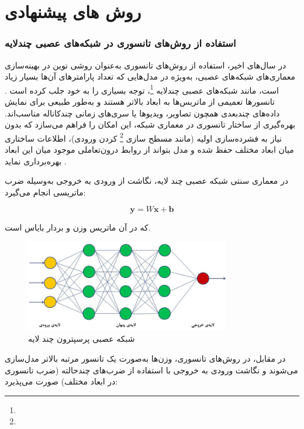 \chapter{روش های پیشنهادی}



\subsection*{استفاده از روش‌های تانسوری در شبکه‌های عصبی چندلایه}

در سال‌های اخیر، استفاده از روش‌های تانسوری به‌عنوان روشی نوین در بهینه‌سازی معماری‌های شبکه‌های عصبی، به‌ویژه در مدل‌هایی که تعداد پارامترهای آن‌ها بسیار زیاد است، مانند شبکه‌های عصبی چندلایه \footnote{}، توجه بسیاری را به خود جلب کرده است \cite{novikov2015tensorizing}. تانسورها تعمیمی از ماتریس‌ها به ابعاد بالاتر هستند و به‌طور طبیعی برای نمایش داده‌های چندبعدی همچون تصاویر، ویدیوها یا سری‌های زمانی چندکاناله مناسب‌اند. بهره‌گیری از ساختار تانسوری در معماری شبکه، این امکان را فراهم می‌سازد که بدون نیاز به فشرده‌سازی اولیه (مانند مسطح سازی \footnote{} کردن ورودی)، اطلاعات ساختاری میان ابعاد مختلف حفظ شده و مدل بتواند از روابط درون‌تعاملی موجود میان این ابعاد بهره‌برداری نماید \cite{novikov2015tensorizing}.

در معماری سنتی شبکه عصبی چند لایه، نگاشت از ورودی  به خروجی  به‌وسیله ضرب ماتریسی انجام می‌گیرد:

\[
\mathbf{y} = W\mathbf{x} + \mathbf{b}
\]

که در آن  ماتریس وزن و  بردار بایاس است.

\begin{figure}[h]
	\centering
	\includegraphics[width=0.8\textwidth]{transformer_images/persian images/b13.png}
	\caption{شبکه عصبی پرسپترون چند لایه}
	\label{fig:Mlp}
\end{figure}

در مقابل، در روش‌های تانسوری، وزن‌ها به‌صورت یک تانسور مرتبه بالاتر مدل‌سازی می‌شوند و نگاشت ورودی به خروجی با استفاده از ضرب‌های چندحالته (ضرب تانسوری در ابعاد مختلف) صورت می‌پذیرد:


